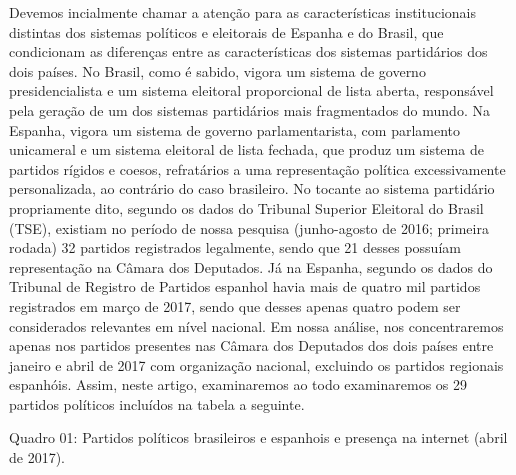 Devemos incialmente chamar a atenção para as características
institucionais distintas dos sistemas políticos e eleitorais de Espanha
e do Brasil, que condicionam as diferenças entre as características dos
sistemas partidários dos dois países. No Brasil, como é sabido, vigora
um sistema de governo presidencialista e um sistema eleitoral
proporcional de lista aberta, responsável pela geração de um dos
sistemas partidários mais fragmentados do mundo. Na Espanha, vigora um
sistema de governo parlamentarista, com parlamento unicameral e um
sistema eleitoral de lista fechada, que produz um sistema de partidos
rígidos e coesos, refratários a uma representação política
excessivamente personalizada, ao contrário do caso brasileiro. No
tocante ao sistema partidário propriamente dito, segundo os dados do
Tribunal Superior Eleitoral do Brasil (TSE), existiam no período de
nossa pesquisa (junho-agosto de 2016; primeira rodada) 32 partidos
registrados legalmente, sendo que 21 desses possuíam representação na
Câmara dos Deputados. Já na Espanha, segundo os dados do Tribunal de
Registro de Partidos espanhol havia mais de quatro mil partidos
registrados em março de 2017, sendo que desses apenas quatro podem ser
considerados relevantes em nível nacional. Em nossa análise, nos
concentraremos apenas nos partidos presentes nas Câmara dos Deputados
dos dois países entre janeiro e abril de 2017 com organização nacional,
excluindo os partidos regionais espanhóis. Assim, neste artigo,
examinaremos ao todo examinaremos os 29 partidos políticos incluídos na
tabela a seguinte.

Quadro 01: Partidos políticos brasileiros e espanhois e presença na
internet (abril de 2017).

